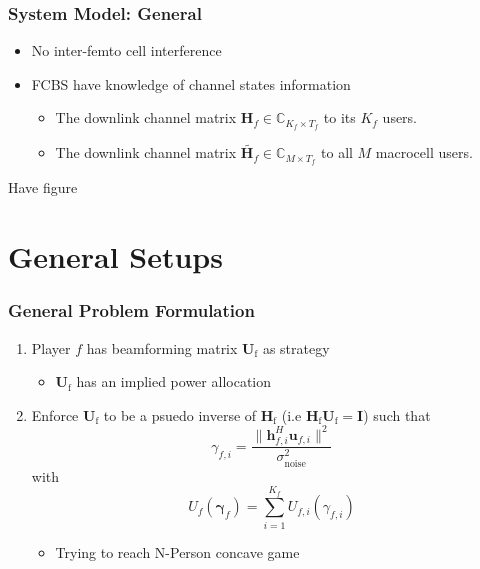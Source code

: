 \documentclass[10pt,tgadventor, onlymath]{beamer}
\begin{document}
\begin{frame}
\frametitle{System Model: General}
\begin{itemize}
\item 
	No inter-femto cell interference
\item 
	FCBS have knowledge of channel states information 
	\begin{itemize}
	\item 
	The downlink channel matrix $\mathbf{H}_f \in \mathbb{C}_{K_{f} \times T_{f}} $ to its $K_{f} $ users.
	\item The downlink channel matrix $\tilde{\mathbf{H}_{f}} \in \mathbb{C}_{M \times T_{f}}$ 
	to all $M$ macrocell users.
	\end{itemize}
\end{itemize}
Have figure
\end{frame}


\section{General Setups}

\begin{frame}
\frametitle{General Problem Formulation}
\begin{enumerate}
\item  Player $f$ has beamforming matrix $\mathbf{U}_\mathrm{f}$ as strategy
\begin{itemize}
\item $\mathbf{U}_\mathrm{f}$ has an implied power allocation
\end{itemize}
\item Enforce $\mathbf{U}_\mathrm{f}$ to be a psuedo inverse of $\mathbf{H}_\mathrm{f}$  (i.e $\mathbf{H}_\mathrm{f}\mathbf{U}_\mathrm{f} = \mathbf{I}$) such that 
	\begin{equation*}
	\gamma_{f,i} = \frac{\|\mathbf{h}^H_{f,i}\mathbf{u}_{f,i}\|^2}
	{\sigma^2_{\text{noise}}}
	\end{equation*}
	with 
	\begin{equation}
	U_{f}(\boldsymbol{\gamma}_{f}) =
	\sum_{i=1}^{K_{f}}
    	 U_{f,i}(\gamma_{f,i}) 
	\end{equation}
\begin{itemize}
\item Trying to reach N-Person concave game
\end{itemize}
\end{enumerate}
\end{frame}
\end{document}
